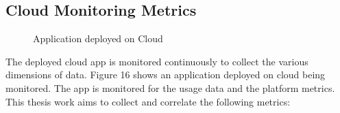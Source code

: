 \documentclass[article,type=msc,colorback,12pt,accentcolor=tud7b]{tudthesis}
\begin{document}
\subsection{Cloud Monitoring Metrics} 

 \begin{figure}
 \begin{center}
  \makebox[\textwidth]{\texttt{[image: D1]}}
\end{center}
\caption{Application deployed on Cloud}
\end{figure}
	
The deployed cloud app is monitored continuously to collect the various dimensions of data. Figure 16 shows an application deployed on cloud being monitored. The app is monitored for the usage data and the platform metrics. This thesis work aims to collect and correlate the following metrics:
\end{document}
